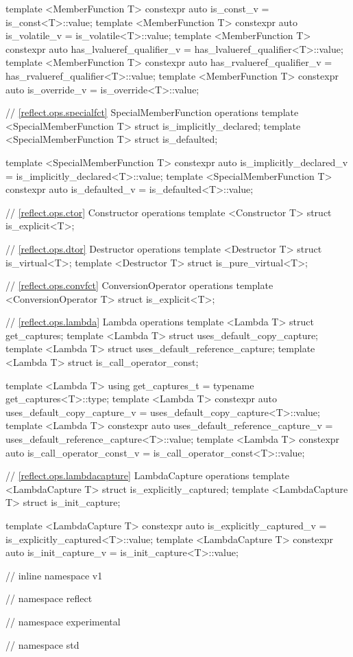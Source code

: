 \begin{std.txt}
\begin{codeblock}
{{{{template <MemberFunction T>
  constexpr auto is_const_v = is_const<T>::value;
template <MemberFunction T>
  constexpr auto is_volatile_v = is_volatile<T>::value;
template <MemberFunction T>
  constexpr auto has_lvalueref_qualifier_v = has_lvalueref_qualifier<T>::value;
template <MemberFunction T>
  constexpr auto has_rvalueref_qualifier_v = has_rvalueref_qualifier<T>::value;
template <MemberFunction T>
  constexpr auto is_override_v = is_override<T>::value;

// \ref{reflect.ops.specialfct} SpecialMemberFunction operations
template <SpecialMemberFunction T> struct is_implicitly_declared;
template <SpecialMemberFunction T> struct is_defaulted;

template <SpecialMemberFunction T>
  constexpr auto is_implicitly_declared_v = is_implicitly_declared<T>::value;
template <SpecialMemberFunction T>
  constexpr auto is_defaulted_v = is_defaulted<T>::value;

// \ref{reflect.ops.ctor} Constructor operations
template <Constructor T> struct is_explicit<T>;

// \ref{reflect.ops.dtor} Destructor operations
template <Destructor T> struct is_virtual<T>;
template <Destructor T> struct is_pure_virtual<T>;

// \ref{reflect.ops.convfct} ConversionOperator operations
template <ConversionOperator T> struct is_explicit<T>;

// \ref{reflect.ops.lambda} Lambda operations
template <Lambda T> struct get_captures;
template <Lambda T> struct uses_default_copy_capture;
template <Lambda T> struct uses_default_reference_capture;
template <Lambda T> struct is_call_operator_const;

template <Lambda T>
  using get_captures_t = typename get_captures<T>::type;
template <Lambda T>
  constexpr auto uses_default_copy_capture_v = uses_default_copy_capture<T>::value;
template <Lambda T>
  constexpr auto uses_default_reference_capture_v = uses_default_reference_capture<T>::value;
template <Lambda T>
  constexpr auto is_call_operator_const_v = is_call_operator_const<T>::value;

// \ref{reflect.ops.lambdacapture} LambdaCapture operations
template <LambdaCapture T> struct is_explicitly_captured;
template <LambdaCapture T> struct is_init_capture;

template <LambdaCapture T>
  constexpr auto is_explicitly_captured_v = is_explicitly_captured<T>::value;
template <LambdaCapture T>
  constexpr auto is_init_capture_v = is_init_capture<T>::value;

} // inline namespace v1
} // namespace reflect
} // namespace experimental
} // namespace std
\end{codeblock}
\end{std.txt}

